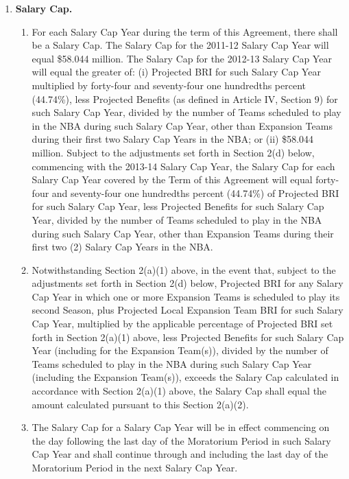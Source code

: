 \documentclass[
]{book}
\providecommand{\tightlist}{%
  \setlength{\itemsep}{0pt}\setlength{\parskip}{0pt}}
\begin{document}
\begin{enumerate}
\def\labelenumi{(\alph{enumi})}
\tightlist
\item
  \textbf{Salary Cap.}

  \begin{enumerate}
  \def\labelenumii{(\arabic{enumii})}
  \tightlist
  \item
    For each Salary Cap Year during the term of this Agreement, there shall be a Salary Cap. The Salary Cap for the 2011-12 Salary Cap Year will equal \$58.044 million. The Salary Cap for the 2012-13 Salary Cap Year will equal the greater of: (i) Projected BRI for such Salary Cap Year multiplied by forty-four and seventy-four one hundredths percent (44.74\%), less Projected Benefits (as defined in Article IV, Section 9) for such Salary Cap Year, divided by the number of Teams scheduled to play in the NBA during such Salary Cap Year, other than Expansion Teams during their first two Salary Cap Years in the NBA; or (ii) \$58.044 million. Subject to the adjustments set forth in Section 2(d) below, commencing with the 2013-14 Salary Cap Year, the Salary Cap for each Salary Cap Year covered by the Term of this Agreement will equal forty-four and seventy-four one hundredths percent (44.74\%) of Projected BRI for such Salary Cap Year, less Projected Benefits for such Salary Cap Year, divided by the number of Teams scheduled to play in the NBA during such Salary Cap Year, other than Expansion Teams during their first two (2) Salary Cap Years in the NBA.
  \item
    Notwithstanding Section 2(a)(1) above, in the event that, subject to the adjustments set forth in Section 2(d) below, Projected BRI for any Salary Cap Year in which one or more Expansion Teams is scheduled to play its second Season, plus Projected Local Expansion Team BRI for such Salary Cap Year, multiplied by the applicable percentage of Projected BRI set forth in Section 2(a)(1) above, less Projected Benefits for such Salary Cap Year (including for the Expansion Team(s)), divided by the number of Teams scheduled to play in the NBA during such Salary Cap Year (including the Expansion Team(s)), exceeds the Salary Cap calculated in accordance with Section 2(a)(1) above, the Salary Cap shall equal the amount calculated pursuant to this Section 2(a)(2).
  \item
    The Salary Cap for a Salary Cap Year will be in effect commencing on the day following the last day of the Moratorium Period in such Salary Cap Year and shall continue through and including the last day of the Moratorium Period in the next Salary Cap Year.

\end{enumerate}
\end{enumerate}
\end{document}
